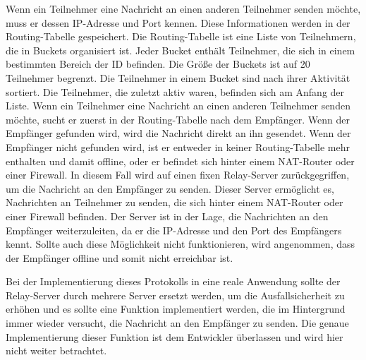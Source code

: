Wenn ein Teilnehmer eine Nachricht an einen anderen Teilnehmer senden möchte, muss er dessen IP-Adresse und Port kennen. Diese Informationen werden in der Routing-Tabelle gespeichert. Die Routing-Tabelle ist eine Liste von Teilnehmern, die in Buckets organisiert ist. Jeder Bucket enthält Teilnehmer, die sich in einem bestimmten Bereich der ID befinden. Die Größe der Buckets ist auf 20 Teilnehmer begrenzt. Die Teilnehmer in einem Bucket sind nach ihrer Aktivität sortiert. Die Teilnehmer, die zuletzt aktiv waren, befinden sich am Anfang der Liste. Wenn ein Teilnehmer eine Nachricht an einen anderen Teilnehmer senden möchte, sucht er zuerst in der Routing-Tabelle nach dem Empfänger. Wenn der Empfänger gefunden wird, wird die Nachricht direkt an ihn gesendet. Wenn der Empfänger nicht gefunden wird, ist er entweder in keiner Routing-Tabelle mehr enthalten und damit offline, oder er befindet sich hinter einem NAT-Router oder einer Firewall. In diesem Fall wird auf einen fixen Relay-Server zurückgegriffen, um die Nachricht an den Empfänger zu senden. Dieser Server ermöglicht es, Nachrichten an Teilnehmer zu senden, die sich hinter einem NAT-Router oder einer Firewall befinden. Der Server ist in der Lage, die Nachrichten an den Empfänger weiterzuleiten, da er die IP-Adresse und den Port des Empfängers kennt. Sollte auch diese Möglichkeit nicht funktionieren, wird angenommen, dass der Empfänger offline und somit nicht erreichbar ist.

Bei der Implementierung dieses Protokolls in eine reale Anwendung sollte der Relay-Server durch mehrere Server ersetzt werden, um die Ausfallsicherheit zu erhöhen und es sollte eine Funktion implementiert werden, die im Hintergrund immer wieder versucht, die Nachricht an den Empfänger zu senden. Die genaue Implementierung dieser Funktion ist dem Entwickler überlassen und wird hier nicht weiter betrachtet.